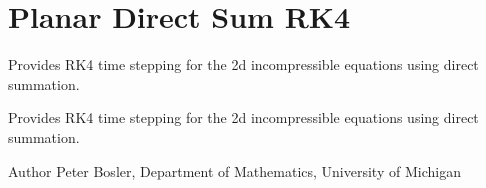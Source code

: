 \hypertarget{group__PlaneDirectSum}{\section{Planar Direct Sum R\+K4}
\label{group__PlaneDirectSum}
}


Provides R\+K4 time stepping for the 2d incompressible equations using direct summation.  


Provides R\+K4 time stepping for the 2d incompressible equations using direct summation. 

\begin{DoxyAuthor}{Author}
Peter Bosler, Department of Mathematics, University of Michigan 
\end{DoxyAuthor}
